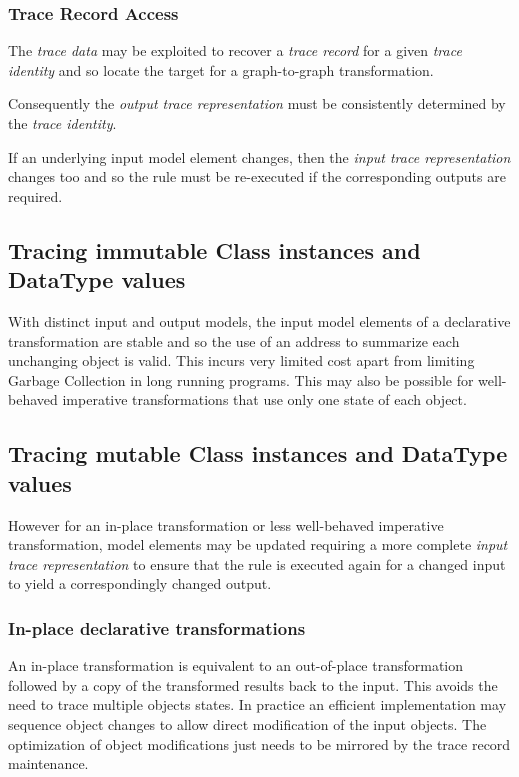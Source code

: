 \documentclass[runningheads,a4paper]{llncs}
\begin{document}
\subsubsection{Trace Record Access}

The \emph{trace data} may be exploited to recover a \emph{trace record} for a given \emph{trace identity} and so locate the target for a graph-to-graph transformation.

Consequently the \emph{output trace representation} must be consistently determined by the \emph{trace identity}.

If an underlying input model element changes, then the \emph{input trace representation} changes too and so the rule must be re-executed if the corresponding outputs are required.

\subsection{Tracing immutable Class instances and DataType values}

With distinct input and output models, the input model elements of a declarative transformation are stable and so the use of an address to summarize each unchanging object is valid. This incurs very limited cost apart from limiting Garbage Collection in long running programs. This may also be possible for well-behaved imperative transformations that use only one state of each object.


\subsection{Tracing mutable Class instances and DataType values}

However for an in-place transformation or less well-behaved imperative transformation, model elements may be updated requiring a more complete \emph{input trace representation} to ensure that the rule is executed again for a changed input to yield a correspondingly changed output.

\subsubsection{In-place declarative transformations}
An in-place transformation is equivalent to an out-of-place transformation followed by a copy of the transformed results back to the input. This avoids the need to trace multiple objects states. In practice an efficient implementation may sequence object changes to allow direct modification of the input objects. The optimization of object modifications just needs to be mirrored by the trace record maintenance.
\end{document}
